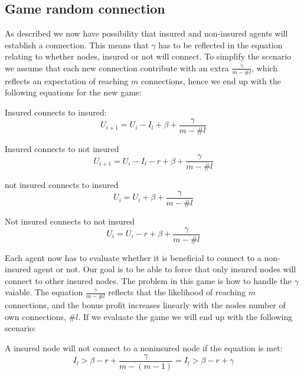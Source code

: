 \subsection{Game random connection}
As described we now have possibility that insured and non-insured agents will establish a connection. This means that $\gamma$ has to be reflected in the equation relating to whether nodes, insured or not will connect. To simplify the scenario we assume that each new connection contribute with an extra $\frac{\gamma}{ m-\#l}$, which reflects an expectation of reaching $m$ connections, hence we end up with the following equations for the new game:

Insured connects to insured:
\begin{equation}
U_{i+1}=U_{i} - I_{l} + \beta + \frac{\gamma}{ m-\#l}
\label{eq:insured-insured}
\end{equation}

Insured connects to not insured
\begin{equation}
U_{i+1}=U_{i} - I_{l} - r + \beta + \frac{\gamma}{ m-\#l}
\label{eq:insured-noninsured}
\end{equation}

not insured connects to insured
\begin{equation}
U_{i}=U_{i}  + \beta + \frac{\gamma}{ m-\#l}
\label{eq:noninsured-insured}
\end{equation}

Not insured connects to not insured
\begin{equation}
U_{i}=U_{i} - r + \beta + \frac{\gamma}{ m-\#l}
\label{eq:noninsured-noninsured}
\end{equation}



Each agent now has to evaluate whether it is beneficial to connect to a non-insured agent or not. Our goal is to be able to force that only insured nodes will connect to other insured nodes. The problem in this game is how to handle the $\gamma $vaiable. 
The equation $\frac{\gamma}{ m-\#l}$ reflects that the likelihood of reaching $m$ connections, and the bonus profit increases linearly with the nodes number of own connections, $\#l$. If we evaluate the game we will end up with the following scenario: 

A insured node will not connect to a noninsured node if the equation is met:
\begin{equation}
I_{l} > \beta - r + \frac{\gamma}{ m-(m-1)}   =    I_{l} > \beta - r + \gamma
\label{eq:solutionToBlockNonInsured2}
\end{equation}

